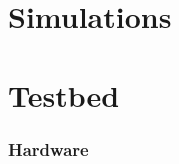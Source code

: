 \documentclass[12pt]{article}
\begin{document}
 \section {Simulations}   
 \section{Testbed}
   \subsubsection{Hardware}
   
   
   
    
    
    
  
\end{document}

